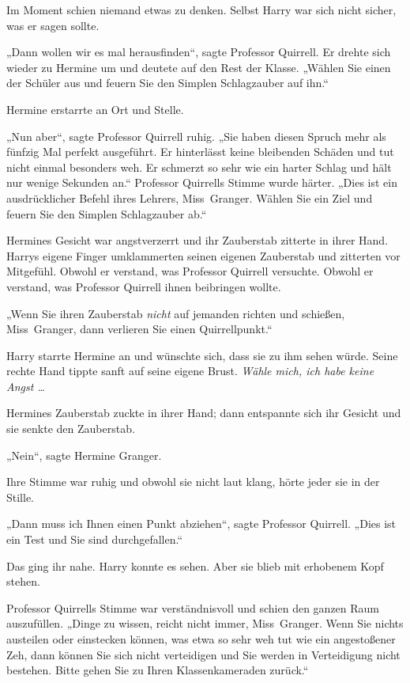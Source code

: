 {Im Moment schien niemand etwas zu denken. Selbst Harry war sich nicht sicher, was er sagen sollte.

„Dann wollen wir es mal herausfinden“, sagte Professor Quirrell. Er drehte sich wieder zu Hermine um und deutete auf den Rest der Klasse. „Wählen Sie einen der Schüler aus und feuern Sie den Simplen Schlagzauber auf ihn.“

Hermine erstarrte an Ort und Stelle.

„Nun aber“, sagte Professor Quirrell ruhig. „Sie haben diesen Spruch mehr als fünfzig Mal perfekt ausgeführt. Er hinterlässt keine bleibenden Schäden und tut nicht einmal besonders weh. Er schmerzt so sehr wie ein harter Schlag und hält nur wenige Sekunden an.“ Professor Quirrells Stimme wurde härter. „Dies ist ein ausdrücklicher Befehl ihres Lehrers, Miss~Granger. Wählen Sie ein Ziel und feuern Sie den Simplen Schlagzauber ab.“

Hermines Gesicht war angstverzerrt und ihr Zauberstab zitterte in ihrer Hand. Harrys eigene Finger umklammerten seinen eigenen Zauberstab und zitterten vor Mitgefühl. Obwohl er verstand, was Professor Quirrell versuchte. Obwohl er verstand, was Professor Quirrell ihnen beibringen wollte.

„Wenn Sie ihren Zauberstab \emph{nicht} auf jemanden richten und schießen, Miss~Granger, dann verlieren Sie einen Quirrellpunkt.“

Harry starrte Hermine an und wünschte sich, dass sie zu ihm sehen würde. Seine rechte Hand tippte sanft auf seine eigene Brust. \emph{Wähle mich, ich habe keine Angst …}

Hermines Zauberstab zuckte in ihrer Hand; dann entspannte sich ihr Gesicht und sie senkte den Zauberstab.

„Nein“, sagte Hermine Granger.

Ihre Stimme war ruhig und obwohl sie nicht laut klang, hörte jeder sie in der Stille.

„Dann muss ich Ihnen einen Punkt abziehen“, sagte Professor Quirrell. „Dies ist ein Test und Sie sind durchgefallen.“

Das ging ihr nahe. Harry konnte es sehen. Aber sie blieb mit erhobenem Kopf stehen.

Professor Quirrells Stimme war verständnisvoll und schien den ganzen Raum auszufüllen. „Dinge zu wissen, reicht nicht immer, Miss~Granger. Wenn Sie nichts austeilen oder einstecken können, was etwa so sehr weh tut wie ein angestoßener Zeh, dann können Sie sich nicht verteidigen und Sie werden in Verteidigung nicht bestehen. Bitte gehen Sie zu Ihren Klassenkameraden zurück.“

}
